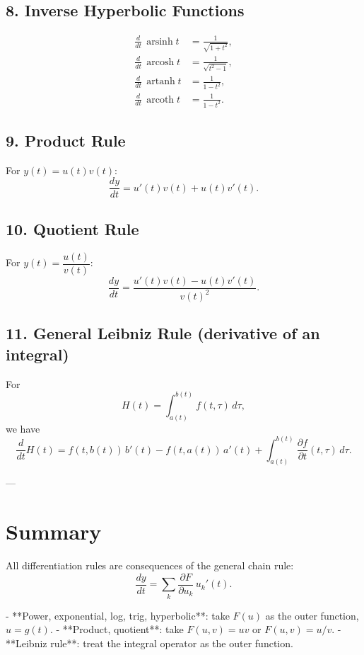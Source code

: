 \documentclass[11pt,a4paper]{article}
\begin{document}
	\subsection*{8. Inverse Hyperbolic Functions}
	\[
	\begin{aligned}
		\frac{d}{dt}\,\operatorname{arsinh} t &= \frac{1}{\sqrt{1+t^2}}, \\
		\frac{d}{dt}\,\operatorname{arcosh} t &= \frac{1}{\sqrt{t^2-1}}, \\
		\frac{d}{dt}\,\operatorname{artanh} t &= \frac{1}{1-t^2}, \\
		\frac{d}{dt}\,\operatorname{arcoth} t &= \frac{1}{1-t^2}.
	\end{aligned}
	\]
	
	\subsection*{9. Product Rule}
	For $y(t)=u(t)v(t)$:
	\[
	\frac{dy}{dt} = u'(t)v(t) + u(t)v'(t).
	\]
	
	\subsection*{10. Quotient Rule}
	For $y(t)=\dfrac{u(t)}{v(t)}$:
	\[
	\frac{dy}{dt} = \frac{u'(t)v(t)-u(t)v'(t)}{v(t)^2}.
	\]
	
	\subsection*{11. General Leibniz Rule (derivative of an integral)}
	For
	$$
	H(t) = \int_{a(t)}^{b(t)} f(t,\tau)\,d\tau,
	$$
	we have
	$$
	\frac{d}{dt}H(t) = f(t,b(t))\,b'(t) - f(t,a(t))\,a'(t)
	+ \int_{a(t)}^{b(t)} \frac{\partial f}{\partial t}(t,\tau)\,d\tau.
	$$
	
	---
	
	\section*{Summary}
	All differentiation rules are consequences of the general chain rule:
	$$
	\frac{dy}{dt} = \sum_k \frac{\partial F}{\partial u_k}\,u_k'(t).
	$$
	
	- **Power, exponential, log, trig, hyperbolic**: take $F(u)$ as the outer function, $u=g(t)$.  
	- **Product, quotient**: take $F(u,v)=uv$ or $F(u,v)=u/v$.  
	- **Leibniz rule**: treat the integral operator as the outer function.
	
\end{document}
